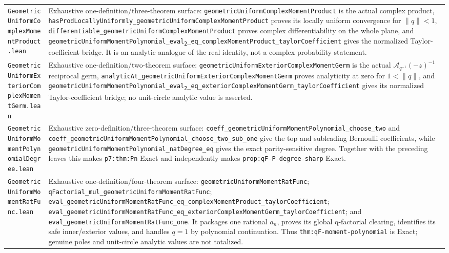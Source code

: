 \documentclass[11pt,oneside]{article}
\theoremstyle{definition}
\theoremstyle{remark}
\begin{document}
\begin{longtable}{>{\raggedright\arraybackslash}p{} >{\raggedright\arraybackslash}p{}}
\nolinkurl{GeometricUniformComplexMomentProduct.lean} & Exhaustive one-definition/three-theorem surface: \nolinkurl{geometricUniformComplexMomentProduct} is the actual complex product, \nolinkurl{hasProdLocallyUniformly_geometricUniformComplexMomentProduct} proves its locally uniform convergence for \(\lVert q\rVert<1\), \nolinkurl{differentiable_geometricUniformComplexMomentProduct} proves complex differentiability on the whole plane, and \nolinkurl{geometricUniformMomentPolynomial_eval}\texttt{\textsubscript{2}}\nolinkurl{_eq_complexMomentProduct_taylorCoefficient} gives the normalized Taylor-coefficient bridge.  It is an analytic analogue of the real identity, not a complex probability statement. \\
\nolinkurl{GeometricUniformExteriorComplexMomentGerm.lean} & Exhaustive one-definition/two-theorem surface: \nolinkurl{geometricUniformExteriorComplexMomentGerm} is the actual \(\mathcal A_{q^{-1}}(-z)^{-1}\) reciprocal germ, \nolinkurl{analyticAt_geometricUniformExteriorComplexMomentGerm} proves analyticity at zero for \(1<\lVert q\rVert\), and \nolinkurl{geometricUniformMomentPolynomial_eval}\texttt{\textsubscript{2}}\nolinkurl{_eq_exteriorComplexMomentGerm_taylorCoefficient} gives its normalized Taylor-coefficient bridge; no unit-circle analytic value is asserted. \\
\nolinkurl{GeometricUniformMomentPolynomialDegree.lean} & Exhaustive zero-definition/three-theorem surface: \nolinkurl{coeff_geometricUniformMomentPolynomial_choose_two} and \nolinkurl{coeff_geometricUniformMomentPolynomial_choose_two_sub_one} give the top and subleading Bernoulli coefficients, while \nolinkurl{geometricUniformMomentPolynomial_natDegree_eq} gives the exact parity-sensitive degree.  Together with the preceding leaves this makes \nolinkurl{p7:thm:Pn} Exact and independently makes \nolinkurl{prop:qF-P-degree-sharp} Exact. \\
\nolinkurl{GeometricUniformMomentRatFunc.lean} & Exhaustive one-definition/four-theorem surface: \nolinkurl{geometricUniformMomentRatFunc}; \nolinkurl{qFactorial_mul_geometricUniformMomentRatFunc}; \nolinkurl{eval_geometricUniformMomentRatFunc_eq_complexMomentProduct_taylorCoefficient}; \nolinkurl{eval_geometricUniformMomentRatFunc_eq_exteriorComplexMomentGerm_taylorCoefficient}; and \nolinkurl{eval_geometricUniformMomentRatFunc_one}.  It packages one rational \(a_n\), proves its global q-factorial clearing, identifies its safe inner/exterior values, and handles \(q=1\) by polynomial continuation.  Thus \nolinkurl{thm:qF-moment-polynomial} is Exact; genuine poles and unit-circle analytic values are not totalized. \\

\end{longtable}
\end{document}
